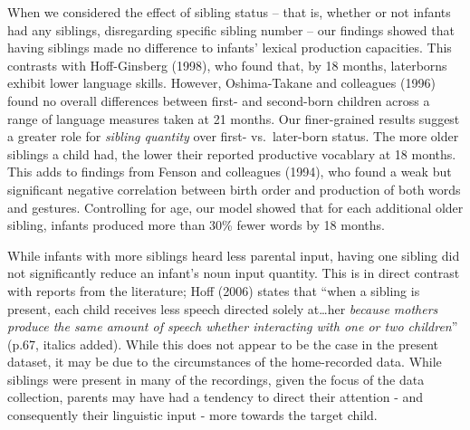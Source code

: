 \documentclass[
  english,
  man,floatsintext]{apa6}
\begin{document}
When we considered the effect of sibling status -- that is, whether or not infants had any siblings, disregarding specific sibling number -- our findings showed that having siblings made no difference to infants' lexical production capacities. This contrasts with Hoff-Ginsberg (1998), who found that, by 18 months, laterborns exhibit lower language skills. However, Oshima-Takane and colleagues (1996) found no overall differences between first- and second-born children across a range of language measures taken at 21 months. Our finer-grained results suggest a greater role for \emph{sibling quantity} over first- vs.~later-born status. The more older siblings a child had, the lower their reported productive vocablary at 18 months. This adds to findings from Fenson and colleagues (1994), who found a weak but significant negative correlation between birth order and production of both words and gestures. Controlling for age, our model showed that for each additional older sibling, infants produced more than 30\% fewer words by 18 months.

While infants with more siblings heard less parental input, having one sibling did not significantly reduce an infant's noun input quantity. This is in direct contrast with reports from the literature; Hoff (2006) states that ``when a sibling is present, each child receives less speech directed solely at\ldots her \emph{because mothers produce the same amount of speech whether interacting with one or two children}'' (p.67, italics added). While this does not appear to be the case in the present dataset, it may be due to the circumstances of the home-recorded data. While siblings were present in many of the recordings, given the focus of the data collection, parents may have had a tendency to direct their attention - and consequently their linguistic input - more towards the target child.
\end{document}
